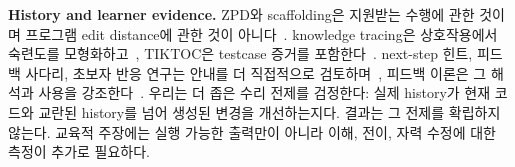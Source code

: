 \documentclass[10pt,conference]{IEEEtran}
\begin{document}
\noindent\textbf{History and learner evidence.} ZPD와 scaffolding은 지원받는 수행에 관한 것이며 프로그램 edit distance에 관한 것이 아니다~\cite{cole1978mind,murray2002toward,chounta2017grey,schulze2024beyond}. knowledge tracing은 상호작용에서 숙련도를 모형화하고~\cite{corbett1994knowledge,piech2015deep,ghosh2020context}, TIKTOC은 testcase 증거를 포함한다~\cite{duan2024tiktoc}. next-step 힌트, 피드백 사다리, 초보자 반응 연구는 안내를 더 직접적으로 검토하며~\cite{roest2024next,heickal2024generating,xiao2024exploring}, 피드백 이론은 그 해석과 사용을 강조한다~\cite{narciss2008feedback,hattie2007power,shute2008focus,aleven2000limitations}. 우리는 더 좁은 수리 전제를 검정한다: 실제 history가 현재 코드와 교란된 history를 넘어 생성된 변경을 개선하는지다. 결과는 그 전제를 확립하지 않는다. 교육적 주장에는 실행 가능한 출력만이 아니라 이해, 전이, 자력 수정에 대한 측정이 추가로 필요하다.
\end{document}

